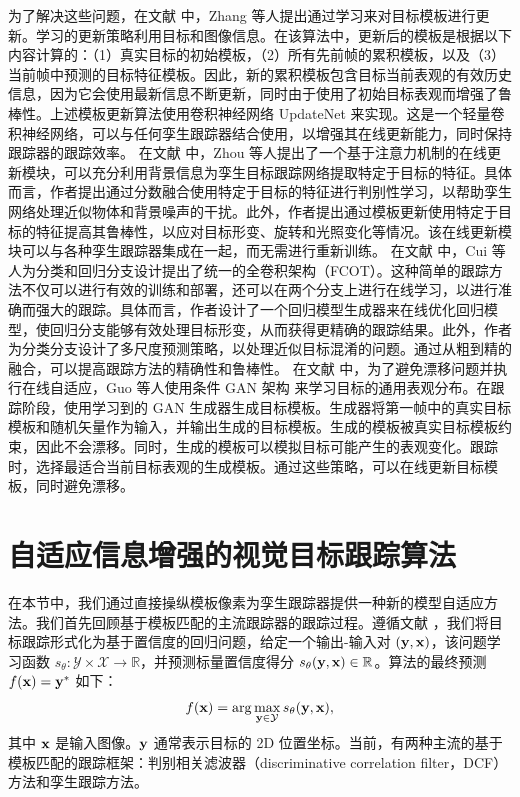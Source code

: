 为了解决这些问题，在文献 \cite{Zhang_2019_ICCV} 中，Zhang 等人提出通过学习来对目标模板进行更新。学习的更新策略利用目标和图像信息。在该算法中，更新后的模板是根据以下内容计算的：（1）真实目标的初始模板，（2）所有先前帧的累积模板，以及（3）当前帧中预测的目标特征模板。因此，新的累积模板包含目标当前表观的有效历史信息，因为它会使用最新信息不断更新，同时由于使用了初始目标表观而增强了鲁棒性。上述模板更新算法使用卷积神经网络 UpdateNet 来实现。这是一个轻量卷积神经网络，可以与任何孪生跟踪器结合使用，以增强其在线更新能力，同时保持跟踪器的跟踪效率。
在文献 \cite{DiscriminativeAnd} 中，Zhou 等人提出了一个基于注意力机制的在线更新模块，可以充分利用背景信息为孪生目标跟踪网络提取特定于目标的特征。具体而言，作者提出通过分数融合使用特定于目标的特征进行判别性学习，以帮助孪生网络处理近似物体和背景噪声的干扰。此外，作者提出通过模板更新使用特定于目标的特征提高其鲁棒性，以应对目标形变、旋转和光照变化等情况。该在线更新模块可以与各种孪生跟踪器集成在一起，而无需进行重新训练。%
在文献 \cite{FCOT} 中，Cui 等人为分类和回归分支设计提出了统一的全卷积架构（FCOT）。这种简单的跟踪方法不仅可以进行有效的训练和部署，还可以在两个分支上进行在线学习，以进行准确而强大的跟踪。具体而言，作者设计了一个回归模型生成器来在线优化回归模型，使回归分支能够有效处理目标形变，从而获得更精确的跟踪结果。此外，作者为分类分支设计了多尺度预测策略，以处理近似目标混淆的问题。通过从粗到精的融合，可以提高跟踪方法的精确性和鲁棒性。 %
在文献 \cite{TGGAN} 中，为了避免漂移问题并执行在线自适应，Guo 等人使用条件 GAN 架构 \cite{cGAN} 来学习目标的通用表观分布。在跟踪阶段，使用学习到的 GAN 生成器生成目标模板。生成器将第一帧中的真实目标模板和随机矢量作为输入，并输出生成的目标模板。生成的模板被真实目标模板约束，因此不会漂移。同时，生成的模板可以模拟目标可能产生的表观变化。跟踪时，选择最适合当前目标表观的生成模板。通过这些策略，可以在线更新目标模板，同时避免漂移。%

\section{自适应信息增强的视觉目标跟踪算法}
在本节中，我们通过直接操纵模板像素为孪生跟踪器提供一种新的模型自适应方法。我们首先回顾基于模板匹配的主流跟踪器的跟踪过程。遵循文献 \cite{Danelljan_2020_CVPR}，我们将目标跟踪形式化为基于置信度的回归问题，给定一个输出-输入对 $(\textbf y,\textbf x)$，该问题学习函数 $s_\theta:\mathcal{Y\times X\rightarrow \mathbb R}$，并预测标量置信度得分 $s_\theta(\textbf y,\textbf x)\in\mathbb R$。算法的最终预测 $f(\textbf x)=\textbf y^*$ 如下：
\begin{equation}
    f(\textbf x) = \arg\max_{\textbf y\in \mathcal Y}s_\theta (\textbf y,\textbf x),
\end{equation}
其中 $\textbf x$ 是输入图像。$\textbf y$ 通常表示目标的 2D 位置坐标。当前，有两种主流的基于模板匹配的跟踪框架：判别相关滤波器（discriminative correlation filter，DCF）方法和孪生跟踪方法。


